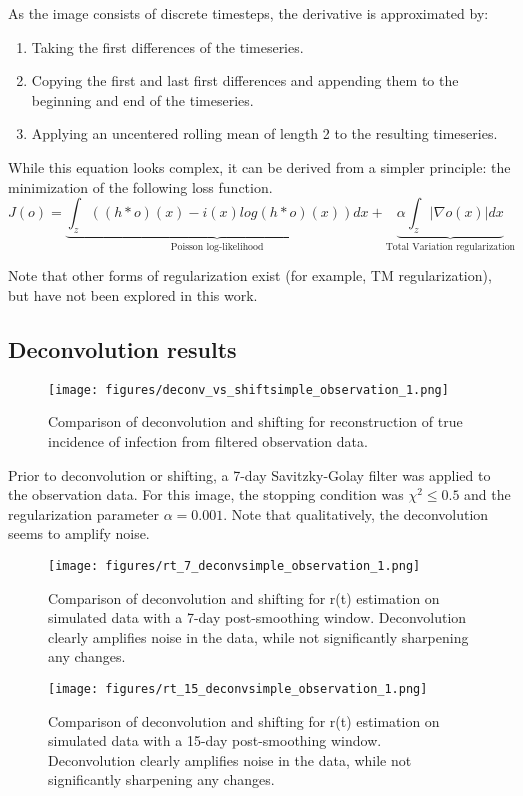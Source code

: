 \documentclass{article}
\begin{document}
{As the image consists of discrete timesteps, the derivative is approximated by:
\begin{enumerate}
	\item Taking the first differences of the timeseries.
	\item Copying the first and last first differences and appending them to the beginning and end of the timeseries.
	\item Applying an uncentered rolling mean of length 2 to the resulting timeseries.
\end{enumerate}

While this equation looks complex, it can be derived from a simpler principle: the minimization of the following loss function. 
\begin{equation}
    J(o) = \underbrace{\int_z ((h*o)(x) - i(x) log(h*o)(x))dx}_{\mbox{Poisson log-likelihood}} + \underbrace{\alpha \int_z |\nabla o(x)| dx}_{\mbox{Total Variation regularization}}
\end{equation}

Note that other forms of regularization exist (for example, TM regularization), but have not been explored in this work.

\subsection{Deconvolution results}
\begin{figure}[h!]
\centering
\texttt{[image: figures/deconv\_vs\_shiftsimple\_observation\_1.png]}
\caption{Comparison of deconvolution and shifting for reconstruction of true incidence of infection from filtered observation data.}
\end{figure}
Prior to deconvolution or shifting, a 7-day Savitzky-Golay filter was applied to the observation data. For this image, the stopping condition was $\chi^2 \leq 0.5$ and the regularization parameter $\alpha = 0.001$. Note that qualitatively, the deconvolution seems to amplify noise.

\clearpage
\begin{figure}[h!]
\centering
\texttt{[image: figures/rt\_7\_deconvsimple\_observation\_1.png]}
\caption{Comparison of deconvolution and shifting for r(t) estimation on simulated data with a 7-day post-smoothing window. Deconvolution clearly amplifies noise in the data, while not significantly sharpening any changes.}
\end{figure}

\begin{figure}[h!]
\centering
\texttt{[image: figures/rt\_15\_deconvsimple\_observation\_1.png]}
\caption{Comparison of deconvolution and shifting for r(t) estimation on simulated data with a 15-day post-smoothing window. Deconvolution clearly amplifies noise in the data, while not significantly sharpening any changes.}
\end{figure}

}
\end{document}
